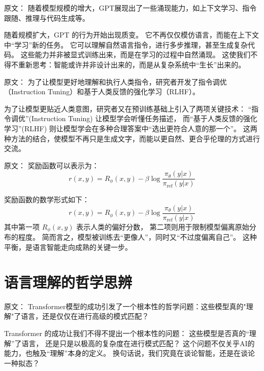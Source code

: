 原文：
随着模型规模的增大，GPT展现出了一些涌现能力，如上下文学习、指令跟随、推理与代码生成等。  

随着规模扩大，GPT 的行为开始出现质变。  
它不再仅仅模仿语言，而能在上下文中“学习”新的任务。  
它可以理解自然语言指令，进行多步推理，甚至生成复杂代码。  
这些能力并非被显式训练出来，而是在学习的过程中自然涌现。  
这使我们不得不重新思考：智能或许并非设计出来的，而是从复杂系统中“生长”出来的。  



原文：
为了让模型更好地理解和执行人类指令，研究者开发了指令调优（Instruction Tuning）和基于人类反馈的强化学习（RLHF）。  

为了让模型更贴近人类意图，研究者又在预训练基础上引入了两项关键技术：  
“指令调优”(Instruction Tuning) 让模型学会听懂任务描述，  
而“基于人类反馈的强化学习”(RLHF) 则让模型学会在多种合理答案中“选出更符合人意的那一个”。  
这两种方法的结合，使模型不再只是生成文字，而能以更自然、更合乎伦理的方式进行交流。  



原文：
奖励函数可以表示为：  
\[
r(x, y) = R_\phi(x, y) - \beta \log \frac{\pi_\theta(y|x)}{\pi_{\text{ref}}(y|x)}
\]  

奖励函数的数学形式如下：  
\[
r(x, y) = R_\phi(x, y) - \beta \log \frac{\pi_\theta(y|x)}{\pi_{\text{ref}}(y|x)}
\]  
其中第一项 $R_\phi(x, y)$ 表示人类的偏好分数，  
第二项则用于限制模型偏离原始分布的程度。  
简而言之，模型被训练去“更像人”，同时又“不过度偏离自己”。  
这种平衡，是语言智能走向成熟的关键一步。  


\section{语言理解的哲学思辨}



原文：
Transformer模型的成功引发了一个根本性的哲学问题：这些模型真的"理解"了语言，还是仅仅在进行高级的模式匹配？  

Transformer 的成功让我们不得不提出一个根本性的问题：  
这些模型是否真的“理解”了语言，  
还是只是以极高的复杂度在进行模式匹配？  
这个问题不仅关乎AI的能力，也触及“理解”本身的定义。  
换句话说，我们究竟在谈论智能，还是在谈论一种拟态？  



